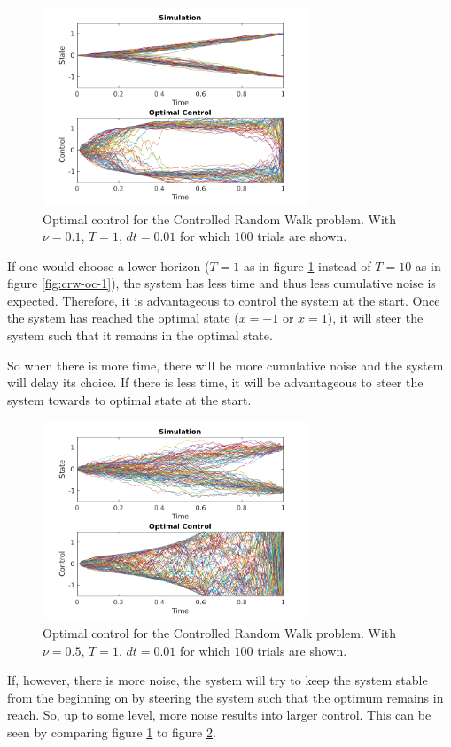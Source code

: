 \documentclass[10pt,a4paper]{article}
\begin{document}
\begin{figure}
\centering
\includegraphics[width=300px]{crw-oc-2.png}
\caption{Optimal control for the Controlled Random Walk problem. With $\nu=0.1$, $T=1$, $dt=0.01$ for which $100$ trials are shown.}
\label{fig:crw-oc-2}
\end{figure}

If one would choose a lower horizon ($T = 1$ as in figure \ref{fig:crw-oc-2} instead of $T = 10$ as in figure \ref{fig:crw-oc-1}), the system has less time and thus less cumulative noise is expected. Therefore, it is advantageous to control the system at the start. Once the system has reached the optimal state ($x = -1$ or $x = 1$), it will steer the system such that it remains in the optimal state.

So when there is more time, there will be more cumulative noise and the system will delay its choice. If there is less time, it will be advantageous to steer the system towards to optimal state at the start.

\begin{figure}[h]
\centering
\includegraphics[width=300px]{crw-oc-3.png}
\caption{Optimal control for the Controlled Random Walk problem. With $\nu=0.5$, $T=1$, $dt=0.01$ for which $100$ trials are shown.}
\label{fig:crw-oc-3}
\end{figure}

If, however, there is more noise, the system will try to keep the system stable from the beginning on by steering the system such that the optimum remains in reach. So, up to some level, more noise results into larger control. This can be seen by comparing figure \ref{fig:crw-oc-2} to figure \ref{fig:crw-oc-3}.
\end{document}
